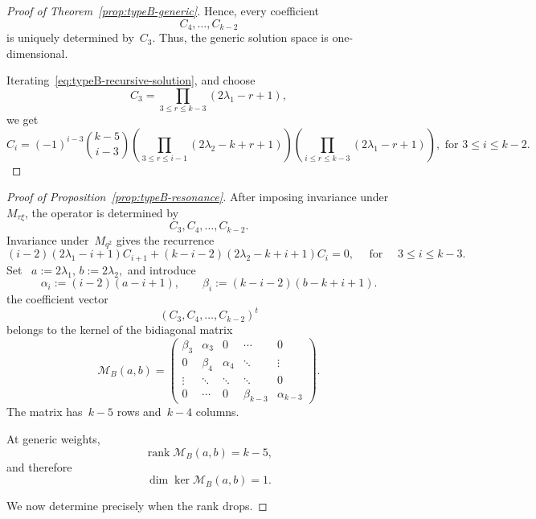 \documentclass[12pt,a4paper]{amsart}
\theoremstyle{thm}
\theoremstyle{definition}
\begin{document}
\begin{proof}[Proof of Theorem~\textup{\ref{prop:typeB-generic}}]
Hence, every coefficient
\[
C_4,\ldots,C_{k-2}
\]
is uniquely determined by~\(C_3\). Thus, the generic solution space is
one-dimensional.

Iterating~\eqref{eq:typeB-recursive-solution}, and choose
\[
C_3
=
\prod_{3\leq r\leq k-3}
(2\lambda_1-r+1),
\]
we get
\begin{equation*}
C_i
=
(-1)^{i-3}
\binom{k-5}{i-3}
\left(
\prod_{3\leq r\leq i-1}
(2\lambda_2-k+r+1)
\right)
\left(
\prod_{i\leq r\leq k-3}
(2\lambda_1-r+1)
\right),  \text{ for } 3\leq i\leq k-2.
\label{eq:typeB-polynomial-Ci}
\end{equation*}
\end{proof}

\begin{proof}[Proof of Proposition~\textup{\ref{prop:typeB-resonance}}]
After imposing invariance under~\(M_{\tau\xi}\), the operator is
determined by
\[
C_3,C_4,\ldots,C_{k-2}.
\]
Invariance under~\(M_{q^2}\) gives the recurrence
\begin{equation*}
(i-2)(2\lambda_1-i+1)C_{i+1}
+
(k-i-2)(2\lambda_2-k+i+1)C_i
=
0,
\quad
\text{ for }
\quad
3\leq i\leq k-3.
\end{equation*}
Set~%
$
a:=2\lambda_1,\,
b:=2\lambda_2,
$
and introduce
\[
\alpha_i:=(i-2)(a-i+1),
\qquad
\beta_i:=(k-i-2)(b-k+i+1).
\]
the coefficient vector
\[
(C_3,C_4,\ldots,C_{k-2})^t
\]
belongs to the kernel of the bidiagonal matrix
\[
\mathcal M_B(a,b)
=
\begin{pmatrix}
\beta_3 & \alpha_3 & 0 & \cdots & 0\\
0 & \beta_4 & \alpha_4 & \ddots & \vdots\\
\vdots & \ddots & \ddots & \ddots & 0\\
0 & \cdots & 0 & \beta_{k-3} & \alpha_{k-3}
\end{pmatrix}.
\]
The matrix has~\(k-5\) rows and~\(k-4\) columns.

At generic weights,
\[
\operatorname{rank}\mathcal M_B(a,b)=k-5,
\]
and therefore
\[
\dim\ker\mathcal M_B(a,b)=1.
\]

We now determine precisely when the rank drops.


\end{proof}
\end{document}
